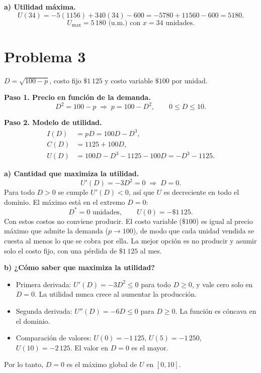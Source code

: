 \documentclass[12pt,letterpaper]{article}
\begin{document}
\textbf{a) Utilidad máxima.}
\[ U(34)=-5(1156)+340(34)-600=-5780+11560-600=5180. \]
\[ \boxed{U_{\max}=5\,180\text{ (u.m.) con }x=34\text{ unidades.}} \]

\section*{Problema 3}
$D=\sqrt{100-p}$, costo fijo $\$1\,125$ y costo variable $\$100$ por unidad.

\textbf{Paso 1. Precio en función de la demanda.}
\[ D^2=100-p\;\Rightarrow\;p=100-D^2,\qquad 0\le D\le 10. \]

\textbf{Paso 2. Modelo de utilidad.}
\begin{align*}
I(D)&=pD=100D-D^3,\\
C(D)&=1125+100D,\\
U(D)&=100D-D^3-1125-100D=-D^3-1125.
\end{align*}

\textbf{a) Cantidad que maximiza la utilidad.}
\[ U'(D)=-3D^2=0\;\Rightarrow\;D=0. \]
Para todo $D>0$ se cumple $U'(D)<0$, así que $U$ es decreciente en todo el dominio. El máximo está en el extremo $D=0$:
\[ \boxed{D^*=0\text{ unidades}},\qquad U(0)=-\$1\,125. \]
Con estos costos no conviene producir. El costo variable ($\$100$) es igual al precio máximo que admite la demanda ($p\to100$), de modo que cada unidad vendida se cuesta al menos lo que se cobra por ella. La mejor opción es no producir y asumir solo el costo fijo, con una pérdida de $\$1\,125$ al mes.

\textbf{b) ¿Cómo saber que maximiza la utilidad?}
\begin{itemize}
\item Primera derivada: $U'(D)=-3D^2\le0$ para todo $D\ge0$, y vale cero solo en $D=0$. La utilidad nunca crece al aumentar la producción.
\item Segunda derivada: $U''(D)=-6D\le0$ para $D\ge0$. La función es cóncava en el dominio.
\item Comparación de valores: $U(0)=-1\,125$, $U(5)=-1\,250$, $U(10)=-2\,125$. El valor en $D=0$ es el mayor.
\end{itemize}
Por lo tanto, $D=0$ es el máximo global de $U$ en $[0,10]$.
\end{document}

